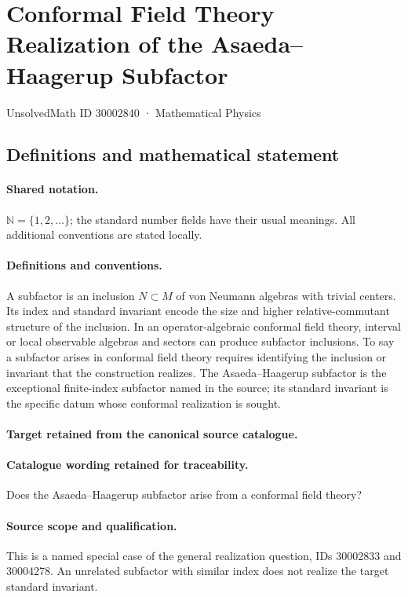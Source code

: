 \documentclass[11pt]{article}
\begin{document}
\setcounter{section}{30002839}
\section{Conformal Field Theory Realization of the Asaeda–Haagerup Subfactor}\label{30002840}
{\small UnsolvedMath ID 30002840 · Mathematical Physics}
\subsection{Definitions and mathematical statement}

\paragraph{Shared notation.}$\mathbb N=\{1,2,\ldots\}$; the standard number fields have their usual meanings. All additional conventions are stated locally.


\paragraph{Definitions and conventions.}
A subfactor is an inclusion $N\subset M$ of von Neumann algebras with trivial centers. Its index and standard invariant encode the size and higher relative-commutant structure of the inclusion. In an operator-algebraic conformal field theory, interval or local observable algebras and sectors can produce subfactor inclusions. To say a subfactor arises in conformal field theory requires identifying the inclusion or invariant that the construction realizes. The Asaeda--Haagerup subfactor is the exceptional finite-index subfactor named in the source; its standard invariant is the specific datum whose conformal realization is sought.

\paragraph{Target retained from the canonical source catalogue.}
\paragraph{Catalogue wording retained for traceability.}
Does the Asaeda–Haagerup subfactor arise from a conformal field theory?

\paragraph{Source scope and qualification.}
This is a named special case of the general realization question, IDs 30002833 and 30004278. An unrelated subfactor with similar index does not realize the target standard invariant.
\end{document}
